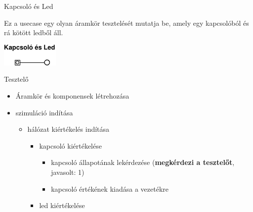 \usecase
{Kapcsoló és Led}
{Ez a usecase egy olyan áramkör tesztelését mutatja be, amely egy kapcsolóból és rá kötött ledből áll.\newline
\begin{center}
\vspace{-15pt}
\includegraphics[scale=1.5]{dw/circuit_test1.pdf}
\vspace{-10pt}
\end{center}
}
{Tesztelő}
{\vspace{-15pt}
\begin{itemize}
\setlength{\itemsep}{0cm}%
\setlength{\parskip}{0cm}%
\item Áramkör és komponensek létrehozása
\item szimuláció indítása
\begin{itemize}
\setlength{\itemsep}{0cm}%
\setlength{\parskip}{0cm}%
\item hálózat kiértékelés indítása
\begin{itemize}
\setlength{\itemsep}{0cm}%
\setlength{\parskip}{0cm}%
	\item kapcsoló kiértékelése
	\begin{itemize}
	\setlength{\itemsep}{0cm}%
	\setlength{\parskip}{0cm}%
		\item kapcsoló állapotának lekérdezése (\textbf{megkérdezi a tesztelőt}, javasolt: 1)
		\item kapcsoló értékének kiadása a vezetékre
	\end{itemize}
	\item led kiértékelése
	\begin{itemize}

\end{itemize}
\end{itemize}
\end{itemize}
\end{itemize}}
